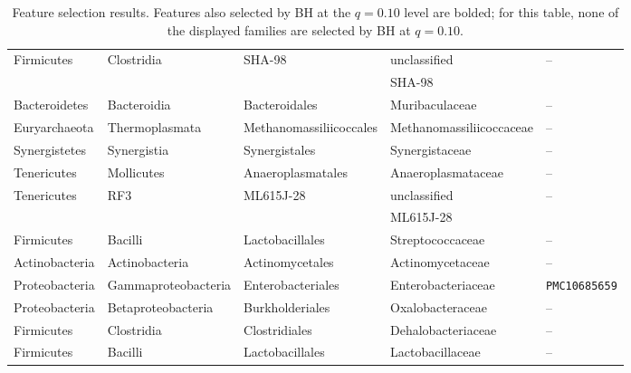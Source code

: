 \begin{table}[ht]
\begin{tabularx}{\textwidth}{@{}>{\raggedright\arraybackslash}X>{\raggedright\arraybackslash}X>{\raggedright\arraybackslash}X>{\raggedright\arraybackslash}X>{\raggedright\arraybackslash}X@{}}
Firmicutes & Clostridia & SHA-98 & unclassified & -- \\
 & & & SHA-98 & \\
Bacteroidetes & Bacteroidia & Bacteroidales & Muribaculaceae & -- \\
Euryarchaeota & Thermoplasmata & Methanomassiliicoccales & Methanomassiliicoccaceae & -- \\
Synergistetes & Synergistia & Synergistales & Synergistaceae & -- \\
Tenericutes & Mollicutes & Anaeroplasmatales & Anaeroplasmataceae & -- \\
Tenericutes & RF3 & ML615J-28 & unclassified & -- \\
 & & & ML615J-28 & \\
Firmicutes & Bacilli & Lactobacillales & Streptococcaceae & -- \\
Actinobacteria & Actinobacteria & Actinomycetales & Actinomycetaceae & -- \\
Proteobacteria & Gammaproteobacteria & Enterobacteriales & Enterobacteriaceae & \texttt{PMC10685659} \\
Proteobacteria & Betaproteobacteria & Burkholderiales & Oxalobacteraceae & -- \\
Firmicutes & Clostridia & Clostridiales & Dehalobacteriaceae & -- \\
Firmicutes & Bacilli & Lactobacillales & Lactobacillaceae & -- \\
\bottomrule
\end{tabularx}
\caption{Feature selection results. Features also selected by BH at the $q=0.10$ level are bolded; for this table, none of the displayed families are selected by BH at $q=0.10$.}
\label{tab:llm_side_info_family}
\end{table}
